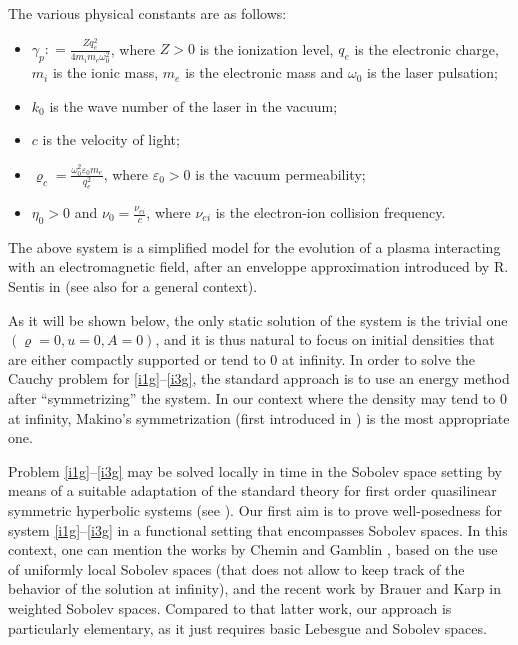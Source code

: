 \documentclass[11pt,twoside]{amsart}
\newcommand{\bFormula}[1]{\begin{equation} \label{#1}}
\newcommand{\eF}{\end{equation}}
\newcommand{\vr}{\varrho}
\begin{document}
The various physical constants are as follows: 
\begin{itemize}  
\item[--] $\gamma_p : = \frac{Zq_e^2}{4m_i m_e \omega_0^2}$, 
where $Z>0$ is the ionization level,
 $q_e$ is the electronic charge,
 $m_i$ is the ionic mass, $m_e$ is the electronic mass and 
$\omega_0$ is the laser pulsation; 

\item[--] 
$k_0$ is  the wave number of the laser in the vacuum;

\item[--]
$c$ is the velocity of light;

\item[--] 
$\varrho_c =\frac{\omega_0^2\varepsilon_0 m_e}{q_e^2}$, where $\varepsilon_0 >0$ is the vacuum permeability;  

\item[--] $\eta_0>0$ and  $\nu_0=\frac{\nu_{ei}}{c}$, where $\nu_{ei}$ is the electron-ion collision frequency.
%
\end{itemize}

\smallbreak
 The above system is a simplified model for the 
evolution of a plasma interacting with an electromagnetic field, after an enveloppe approximation introduced by R. Sentis in \cite{S1} (see also \cite{S2} for a general context).

As it will be shown below, the only static solution of the system is the trivial one $(\vr=0,u=0,A=0)$, and it is thus natural to focus on  initial densities that are either compactly supported or tend to $0$ at infinity. 
 In order to solve the Cauchy problem for \eqref{i1g}--\eqref{i3g},
 the standard approach is
 to use an energy  method after ``symmetrizing'' the system.
 In our context where the density may tend to $0$ at infinity,
Makino's  symmetrization  (first introduced in \cite{Ma}) is the most appropriate one. 

Problem \eqref{i1g}--\eqref{i3g} may be solved locally in time in the Sobolev space setting
by  means of a suitable  adaptation of the standard theory for first order  
quasilinear symmetric hyperbolic systems (see \cite{be}).  
%
Our first aim  is to  prove well-posedness for  system \eqref{i1g}--\eqref{i3g} in a functional setting that encompasses Sobolev spaces. In this context, one can  mention the works  by Chemin \cite{C} and  Gamblin \cite{ga}, 
based on the use of uniformly local Sobolev spaces (that
does not allow to keep track of the behavior of the solution at infinity), 
and the recent work by  Brauer and Karp \cite{BK} in weighted
Sobolev spaces. 
Compared to that latter  work, our approach is particularly elementary, as it
just requires basic Lebesgue and Sobolev spaces. 
 
\end{document}
